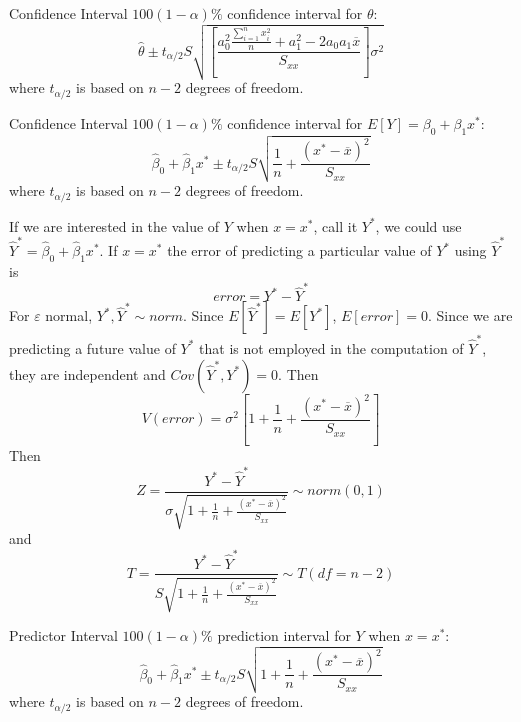 \documentclass[12pt, a4paper, twoside, openright, titlepage]{book}
\begin{document}
\begin{rmk}{Confidence Interval}{}
    $100(1-\alpha)\%$ confidence interval for $\theta$: \begin{equation*}
        \hat{\theta} \pm t_{\alpha/2}S\sqrt{\left[\frac{a_0^2 \frac{\sum_{i=1}^nx_i^2}{n} + a_1^2 - 2a_0a_1\overline{x}}{S_{xx}}\right]\sigma^2}
    \end{equation*}
    where $t_{\alpha/2}$ is based on $n-2$ degrees of freedom.
\end{rmk}




\begin{rmk}{Confidence Interval}{}
    $100(1-\alpha)\%$ confidence interval for $E[Y] = \beta_0+\beta_1x^*$: \begin{equation*}
        \hat{\beta}_0+\hat{\beta}_1x^*\pm t_{\alpha/2}S\sqrt{\frac{1}{n} + \frac{(x^* - \overline{x})^2}{S_{xx}}}
    \end{equation*}
    where $t_{\alpha/2}$ is based on $n-2$ degrees of freedom.
\end{rmk}

If we are interested in the value of $Y$ when $x = x^*$, call it $Y^*$, we could use $\hat{Y}^* = \hat{\beta}_0+\hat{\beta}_1x^*$. If $x = x^*$ the error of predicting a particular value of $Y^*$ using $\hat{Y}^*$ is \begin{equation*}
    error = Y^* - \hat{Y}^*
\end{equation*}
For $\varepsilon$ normal, $Y^*, \hat{Y}^*\sim norm$. Since $E[\hat{Y}^*] = E[Y^*]$, $E[error] = 0$. Since we are predicting a future value of $Y^*$ that is not employed in the computation of $\hat{Y}^*$, they are independent and $Cov(\hat{Y}^*,Y^*) = 0$. Then \begin{equation*}
    V(error) = \sigma^2\left[1 + \frac{1}{n} + \frac{(x^*-\overline{x})^2}{S_{xx}}\right]
\end{equation*}
Then \begin{equation*}
    Z = \frac{Y^* - \hat{Y}^*}{\sigma\sqrt{1 + \frac{1}{n} + \frac{(x^*-\overline{x})^2}{S_{xx}}}} \sim norm(0,1)
\end{equation*}
and \begin{equation*}
    T = \frac{Y^* - \hat{Y}^*}{S\sqrt{1 + \frac{1}{n} + \frac{(x^*-\overline{x})^2}{S_{xx}}}} \sim T(df = n-2)
\end{equation*}

\begin{rmk}{Predictor Interval}{}
    $100(1-\alpha)\%$ prediction interval for $Y$ when $x = x^*$: \begin{equation*}
        \hat{\beta}_0+\hat{\beta}_1x^*\pm t_{\alpha/2}S\sqrt{1+\frac{1}{n} + \frac{(x^* - \overline{x})^2}{S_{xx}}}
    \end{equation*}
    where $t_{\alpha/2}$ is based on $n-2$ degrees of freedom.
\end{rmk}
\end{document}
